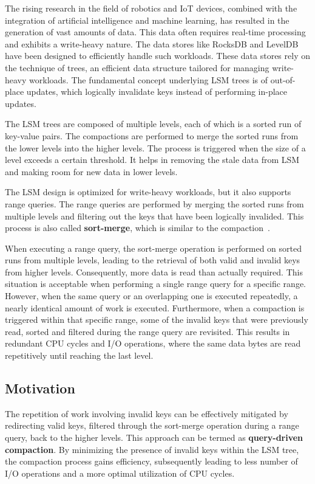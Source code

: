  The rising research in the field of robotics and IoT devices, combined with the 
integration of artificial intelligence and machine learning, has resulted in the generation of vast amounts of data.
This data often requires real-time processing and exhibits a write-heavy nature. The data stores like RocksDB and 
LevelDB have been designed to efficiently handle such workloads. These data stores rely on the technique of
 trees, an efficient data structure tailored for managing write-heavy workloads. The
fundamental concept underlying LSM trees is of out-of-place updates, which logically invalidate keys instead of 
performing in-place updates.

 The LSM trees are composed of multiple levels, each of which is a sorted run of key-value pairs. 
The compactions are performed to merge the sorted runs from the lower levels into the higher levels. The process is 
triggered when the size of a level exceeds a certain threshold. It helps in removing the stale data from LSM and 
making room for new data in lower levels.

 The LSM design is optimized for write-heavy workloads, but it also supports range queries. The
range queries are performed by merging the sorted runs from multiple levels and filtering out the keys that have been
logically invalided. This process is also called \textbf{sort-merge}, which is similar to the compaction~\cite{Sarkar2021}.

 When executing a range query, the sort-merge operation is performed on sorted runs from multiple 
levels, leading to the retrieval of both valid and invalid keys from higher levels. Consequently, more data is read than 
actually required. This situation is acceptable when performing a single range query for a specific range. However, when 
the same query or an overlapping one is executed repeatedly, a nearly identical amount of work is executed. Furthermore, 
when a compaction is triggered within that specific range, some of the invalid keys that were previously read, sorted 
and filtered during the range query are revisited. This results in redundant CPU cycles and I/O operations, where the 
same data bytes are read repetitively until reaching the last level.


\subsection{Motivation}
The repetition of work involving invalid keys can be effectively mitigated by redirecting valid keys, filtered through 
the sort-merge operation during a range query, back to the higher levels. This approach can be termed as 
\textbf{query-driven compaction}. By minimizing the presence of invalid keys within the LSM tree, the compaction process 
gains efficiency, subsequently leading to less number of I/O operations and a more optimal utilization of CPU cycles.


